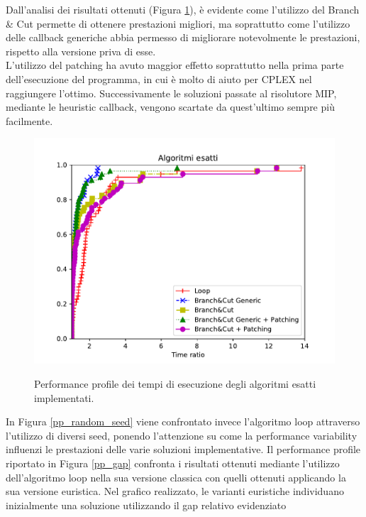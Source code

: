 Dall'analisi dei risultati ottenuti (Figura \ref{pp_exact}), è evidente come l'utilizzo del Branch \& Cut permette di ottenere prestazioni migliori, ma soprattutto come l'utilizzo delle callback generiche abbia permesso di migliorare notevolmente le prestazioni, rispetto alla versione priva di esse.\\
L'utilizzo del patching ha avuto maggior effetto soprattutto nella prima parte dell'esecuzione del programma, in cui è molto di aiuto per CPLEX nel raggiungere l'ottimo. Successivamente le soluzioni passate al risolutore MIP, mediante le heuristic callback, vengono scartate da quest'ultimo sempre più facilmente.\\
\begin{figure}[H] 
\begin{center} 
  \includegraphics[scale=0.75]{Images/pp_exact}\\ 
  \caption{\footnotesize{Performance profile dei tempi di esecuzione degli algoritmi esatti implementati.}}
  \label{pp_exact} 
\end{center} 
\end{figure}
In Figura \ref{pp_random_seed} viene confrontato invece l'algoritmo loop attraverso l'utilizzo di diversi seed, ponendo l'attenzione su come la performance variability influenzi le prestazioni delle varie soluzioni implementative.
Il performance profile riportato in Figura \ref{pp_gap} confronta i risultati ottenuti mediante l'utilizzo dell'algoritmo loop nella sua versione classica con quelli ottenuti applicando la sua versione euristica. Nel grafico realizzato, le varianti euristiche individuano inizialmente una soluzione utilizzando il gap relativo evidenziato 
